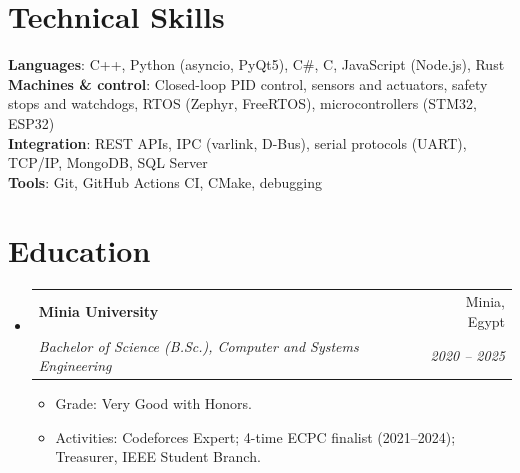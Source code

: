 \documentclass[letterpaper,11pt]{article}
\makeatletter
\newcommand{\resumeItem}[1]{
  \item\small{
    {#1 \vspace{-2pt}}
  }
}
\newcommand{\resumeSubheading}[4]{
  \vspace{-2pt}\item
    \begin{tabular*}{0.97\textwidth}[t]{l@{\extracolsep{\fill}}r}
      \textbf{#1} & #2 \\
      \textit{\small#3} & \textit{\small #4} \\
    \end{tabular*}\vspace{-7pt}
}
\newcommand{\resumeSubHeadingListStart}{\begin{itemize}[leftmargin=0.15in, label={}]}
\newcommand{\resumeSubHeadingListEnd}{\end{itemize}}
\newcommand{\resumeItemListStart}{\begin{itemize}}
\newcommand{\resumeItemListEnd}{\end{itemize}\vspace{-5pt}}
\makeatother
\begin{document}
\section{Technical Skills}
 \begin{itemize}[leftmargin=0.15in, label={}]
    \small{\item{
     \textbf{Languages}{: C++, Python (asyncio, PyQt5), C\#, C, JavaScript (Node.js), Rust} \\
     \textbf{Machines \& control}{: Closed-loop PID control, sensors and actuators, safety stops and watchdogs, RTOS (Zephyr, FreeRTOS), microcontrollers (STM32, ESP32)} \\
     \textbf{Integration}{: REST APIs, IPC (varlink, D-Bus), serial protocols (UART), TCP/IP, MongoDB, SQL Server} \\
     \textbf{Tools}{: Git, GitHub Actions CI, CMake, debugging}
    }}
 \end{itemize}

\section{Education}
  \resumeSubHeadingListStart
    \resumeSubheading
      {Minia University}{Minia, Egypt}
      {Bachelor of Science (B.Sc.), Computer and Systems Engineering}{2020 -- 2025}
      \resumeItemListStart
        \resumeItem{Grade: Very Good with Honors.}
        \resumeItem{Activities: Codeforces Expert; 4-time ECPC finalist (2021--2024); Treasurer, IEEE Student Branch.}
      \resumeItemListEnd
  \resumeSubHeadingListEnd


\end{document}
